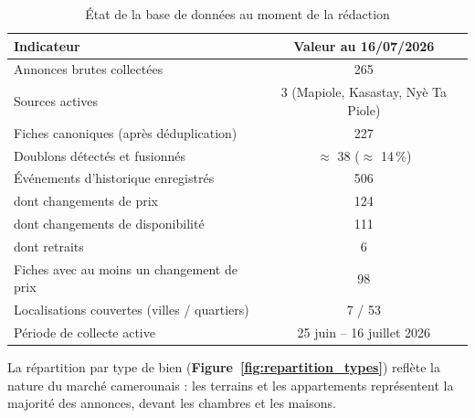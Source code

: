 \begin{table}[H]
    \centering
    \small
    \renewcommand{\arraystretch}{1.3}
    \begin{tabular}{|l|c|}
        \hline
        \rowcolor{headergray}
        \textbf{Indicateur} & \textbf{Valeur au 16/07/2026} \\ \hline
        Annonces brutes collect\'ees & 265 \\ \hline
        Sources actives & 3 (Mapiole, Kasastay, Ny\`e Ta Piole) \\ \hline
        Fiches canoniques (apr\`es d\'eduplication) & 227 \\ \hline
        Doublons d\'etect\'es et fusionn\'es & $\approx$ 38 ($\approx$ 14\,\%) \\ \hline
        \'Ev\'enements d'historique enregistr\'es & 506 \\ \hline
        \quad dont changements de prix & 124 \\ \hline
        \quad dont changements de disponibilit\'e & 111 \\ \hline
        \quad dont retraits & 6 \\ \hline
        Fiches avec au moins un changement de prix & 98 \\ \hline
        Localisations couvertes (villes / quartiers) & 7 / 53 \\ \hline
        P\'eriode de collecte active & 25 juin -- 16 juillet 2026 \\ \hline
    \end{tabular}
    \caption{\'Etat de la base de donn\'ees au moment de la r\'edaction}
    \label{tab:etat_base}
\end{table}

La r\'epartition par type de bien (\textbf{Figure~\ref{fig:repartition_types}}) refl\`ete la nature du march\'e camerounais : les terrains et les appartements repr\'esentent la majorit\'e des annonces, devant les chambres et les maisons.

